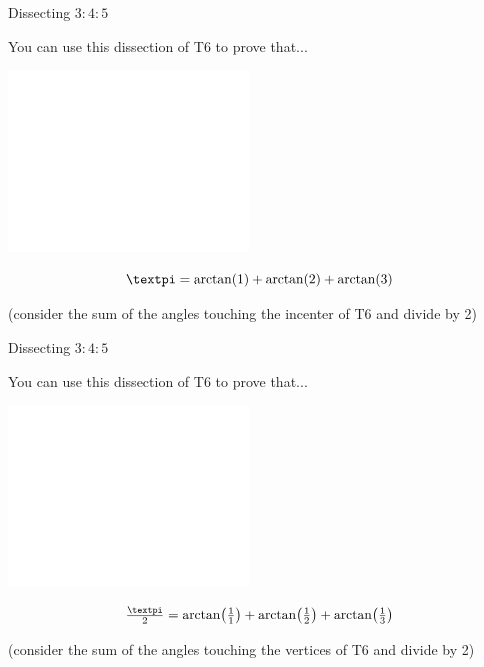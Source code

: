 \documentclass[14pt]{beamer}
\begin{document}
    \begin{frame}{Dissecting $3\!\!:\!\!4\!\!:\!\!5$}
        \begin{center}
            You can use this dissection of T6 to prove that...

            \bigskip\bigskip

            \includegraphics[height=18ex]{figures/figure006c.pdf}\vspace{-1em}

            $$\text{\textpi} = \arctan{\!\left(1\right)} + \arctan{\!\left(2\right)} + \arctan{\!\left(3\right)}$$

            {\footnotesize(consider the sum of the angles touching the incenter of T6 and divide by 2)}
        \end{center}
    \end{frame}


    \begin{frame}{Dissecting $3\!\!:\!\!4\!\!:\!\!5$}
        \begin{center}
            You can use this dissection of T6 to prove that...

            \bigskip\bigskip

            \includegraphics[height=18ex]{figures/figure006c.pdf}\vspace{-1em}

            $$\tfrac{\text{\textpi}}{2} = \arctan{\!\left(\tfrac{1}{1}\right)} + \arctan{\!\left(\tfrac{1}{2}\right)} + \arctan{\!\left(\tfrac{1}{3}\right)}$$

            {\footnotesize(consider the sum of the angles touching the vertices of T6 and divide by 2)}
        \end{center}
    \end{frame}
\end{document}
